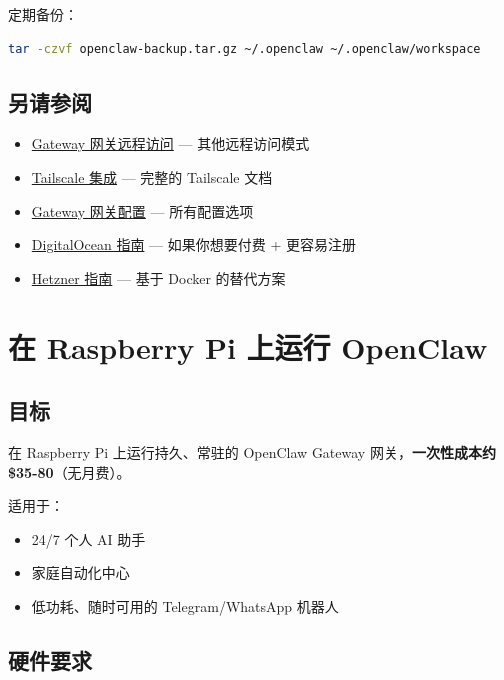 定期备份：

\begin{lstlisting}[language=bash]
tar -czvf openclaw-backup.tar.gz ~/.openclaw ~/.openclaw/workspace
\end{lstlisting}


\hrulefill


\subsection{另请参阅}


\begin{itemize}
  \item \href{/gateway/remote}{Gateway 网关远程访问} — 其他远程访问模式
  \item \href{/gateway/tailscale}{Tailscale 集成} — 完整的 Tailscale 文档
  \item \href{/gateway/configuration}{Gateway 网关配置} — 所有配置选项
  \item \href{/platforms/digitalocean}{DigitalOcean 指南} — 如果你想要付费 + 更容易注册
  \item \href{/install/hetzner}{Hetzner 指南} — 基于 Docker 的替代方案
\end{itemize}



\clearpage

\section{在 Raspberry Pi 上运行 OpenClaw}


\subsection{目标}


在 Raspberry Pi 上运行持久、常驻的 OpenClaw Gateway 网关，\textbf{一次性成本约 \$35-80}（无月费）。

适用于：

\begin{itemize}
  \item 24/7 个人 AI 助手
  \item 家庭自动化中心
  \item 低功耗、随时可用的 Telegram/WhatsApp 机器人
\end{itemize}


\subsection{硬件要求}



